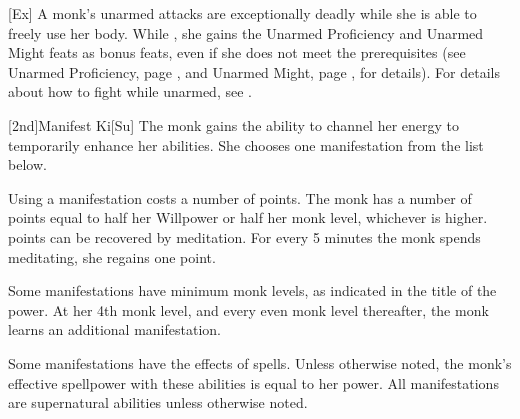         [Ex]
        A monk's unarmed attacks are exceptionally deadly while she is able to freely use her body.
        While \monkunencumbered, she gains the Unarmed Proficiency and Unarmed Might feats as bonus feats, even if she does not meet the prerequisites (see Unarmed Proficiency, page , and Unarmed Might, page , for details).
        For details about how to fight while unarmed, see .

        [2nd]{Manifest Ki}[Su]
        The monk gains the ability to channel her \ki energy to temporarily enhance her abilities.
        She chooses one \ki manifestation from the list below.

        Using a \ki manifestation costs a number of \ki points.
        The monk has a number of \ki points equal to half her Willpower or half her monk level, whichever is higher.
        \Ki points can be recovered by meditation.
        For every 5 minutes the monk spends meditating, she regains one \ki point.

        Some \ki manifestations have minimum monk levels, as indicated in the title of the power.
        At her 4th monk level, and every even monk level thereafter, the monk learns an additional \ki manifestation.

        Some \ki manifestations have the effects of spells.
        Unless otherwise noted, the monk's effective spellpower with these abilities is equal to her \ki power.
        All \ki manifestations are supernatural abilities unless otherwise noted.

